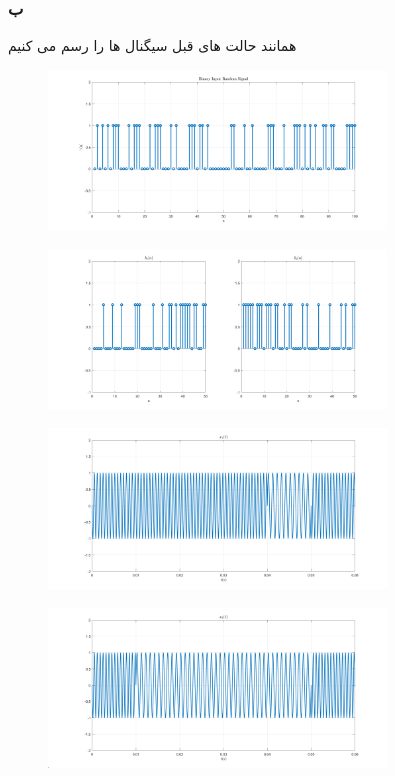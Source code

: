 \documentclass[a4paper]{article}
\begin{document}
	\subsubsection*{ب}
	همانند حالت های قبل سیگنال ها را رسم می کنیم
	\begin{figure}[H]
		\includegraphics[width=0.8\textwidth]{comsys_fig35.png}\\ 
		\centering
	\end{figure}
	\begin{figure}[H]
		\includegraphics[width=0.8\textwidth]{comsys_fig36.png}\\ 
		\centering
	\end{figure}
	\begin{figure}[H]
		\includegraphics[width=0.8\textwidth]{comsys_fig37.png}\\ 
		\centering
	\end{figure}
	\begin{figure}[H]
		\includegraphics[width=0.8\textwidth]{comsys_fig38.png}\\ 
		\centering
	\end{figure}
\end{document}
